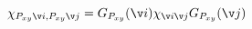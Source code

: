 \begin{equation}
\chi_{P_{xy}\v i,P_{xy}\v j}= G_{P_{xy}}(\v i)\chi_{\v i\v j} G_{P_{xy}}(\v j)
\end{equation}

